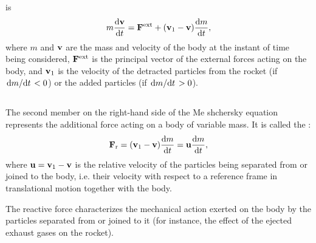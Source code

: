  is
\begin{equation*}%
m \dv{\vb{v}}{t} = \vb{F}^{\textrm{ext}} + (\vb{v}_{1} - \vb{v} ) \dv{m}{t},
\end{equation*}
where $m$ and $\vb{v}$ are the mass and velocity of the body at the instant of time being considered, $\vb{F}^{\textrm{ext}}$ is the principal vector of the external forces  acting on the body, and $\vb{v}_{1}$ is the velocity of the detracted particles  from the rocket (if $\dv*{m}{t} < 0$) or the added particles  (if $\dv*{m}{t} > 0$).

\subsection{}\label{2.6.2} The second member on the right-hand side of the Me­ shchersky equation represents the additional force acting on a body of variable mass. It is called the :
\begin{equation*}%
\vb{F}_{\textrm{r}}= (\vb{v}_{1} - \vb{v} ) \dv{m}{t}
= \vb{u}  \dv{m}{t},
\end{equation*}
where $\vb{u} = \vb{v}_{1} - \vb{v} $ is the relative velocity of the particles being separated from or joined to the body, i.e. their velocity with respect to a reference frame in translational motion together with the body.

The reactive force characterizes the mechanical action exerted on the body by the particles separated from or joined to it (for instance, the effect of the ejected exhaust gases on the rocket). 

